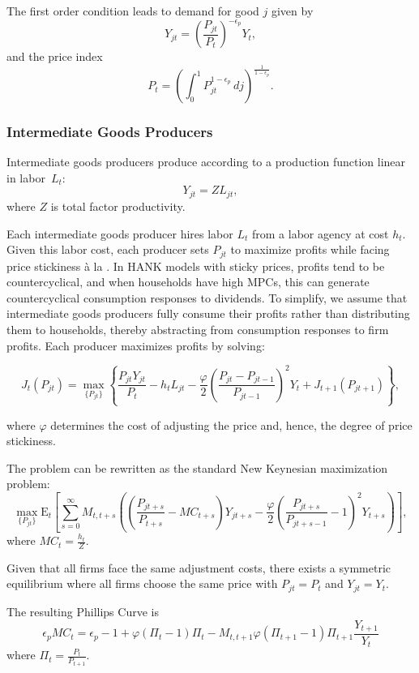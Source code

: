 \documentclass[\econtexRoot/HAFiscal]{subfiles}
\begin{document}
The first order condition leads to demand for good $j$ given by
$$Y_{jt} = \left(\frac {P_{jt}}{P_{t}}\right)^{- \epsilon_{p}} Y_{t},$$
and the price index
$$P_{t} = \left(\int_{0}^{1} P_{jt}^{1-\epsilon_{p}}\,dj \right )^{\frac{1}{1-\epsilon_{p}}}.$$


\subsubsection{Intermediate Goods Producers}

Intermediate goods producers produce according to a production function linear in labor~$L_{t}$: 
$$Y_{jt} =  Z L_{jt},$$ 
where $Z$ is total factor productivity.
  
Each intermediate goods producer hires labor \( L_t \) from a labor agency at cost \( h_t \). Given this labor cost, each producer sets \( P_{jt} \) to maximize profits while facing price stickiness à la \cite{Rotemberg1982}. In HANK models with sticky prices, profits tend to be countercyclical, and when households have high MPCs, this can generate countercyclical consumption responses to dividends. To simplify, we assume that intermediate goods producers fully consume their profits rather than distributing them to households, thereby abstracting from consumption responses to firm profits. Each producer maximizes profits by solving:

$$J_{t}\left(P_{jt}\right) = \max_{\{P_{jt}\}} \left\{\frac{P_{jt}Y_{jt}}{P_{t}} - h_{t} L_{jt} -  \frac{\varphi}{2}\left( \frac{P_{jt} - P_{jt-1}}{P_{jt-1}} \right)^{2} Y_{t}  + J_{t+1}\left(P_{jt+1}\right) \right\},$$ 

where $\varphi$ determines the cost of adjusting the price and, hence, the degree of price stickiness. 

The problem can be rewritten as the standard New Keynesian maximization problem:
$$\max_{\{P_{jt}\}} \mathrm{E}_{t}\left[\sum_{s=0}^{\infty}  M_{t,t+s} \left( \left( \frac{P_{jt+s}}{P_{t+s}} - MC_{t+s}\right)Y_{jt+s} -  \frac{\varphi}{2}\left( \frac{P_{jt+s}}{P_{jt+s-1}} - 1\right)^{2} Y_{t+s} \right)\right],$$ 
where $MC_{t} = \frac{h_{t}}{Z}$.

Given that all firms face the same adjustment costs, there exists a symmetric equilibrium where all firms choose the same price with $P_{jt}=P_{t}$ and $Y_{jt}=Y_{t}$.

The resulting Phillips Curve is
$$ \epsilon_{p} MC_{t} = \epsilon_{p} - 1 + \varphi ( \Pi_{t} -1) \Pi_{t} - M_{t,t+1} \varphi (\Pi_{t+1} -1 ) \Pi_{t+1} \frac{Y_{t+1}}{Y_{t}}$$
where $\Pi_{t} = \frac{P_{t}}{P_{t+1}}$. 
\end{document}
